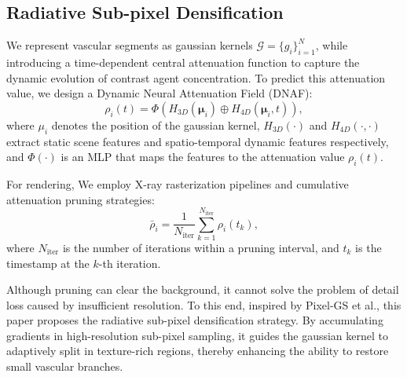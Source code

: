 \documentclass[runningheads]{llncs}
\begin{document}
\subsection{Radiative Sub-pixel Densification}%
We represent vascular segments as gaussian kernels \(\mathcal{G} = \{g_i\}_{i=1}^{N}\), while introducing a time-dependent central attenuation function to capture the dynamic evolution of contrast agent concentration. To predict this attenuation value, we design a Dynamic Neural Attenuation Field (DNAF):
\begin{equation}
\rho_i(t) = \Phi\left(H_{3D}(\bm{\mu}_i) \oplus H_{4D}(\bm{\mu}_i, t)\right),
\end{equation}
where \(\mu_i\) denotes the position of the gaussian kernel, \(H_{3D}(\cdot)\)\cite{muller2022instant} and \(H_{4D}(\cdot,\cdot)\)\cite{park2023temporal} extract static scene features and spatio-temporal dynamic features respectively, and \(\Phi(\cdot)\) is an MLP that maps the features to the attenuation value \(\rho_i(t)\).

For rendering, We employ X-ray rasterization pipelines and cumulative attenuation pruning strategies:
\begin{equation}
\bar{\rho}_i = \frac{1}{N_{\text{iter}}} \sum_{k=1}^{N_{\text{iter}}} \rho_i(t_k),
\end{equation}
where $N_{\text{iter}}$ is the number of iterations within a pruning interval, and $t_k$ is the timestamp at the $k$-th iteration. %

Although pruning can clear the background, it cannot solve the problem of detail loss caused by insufficient resolution. To this end, inspired by Pixel-GS et al.\cite{zhang2024pixel}\cite{bulo2024revising}, this paper proposes the radiative sub-pixel densification strategy. By accumulating gradients in high-resolution sub-pixel sampling, it guides the gaussian kernel to adaptively split in texture-rich regions, thereby enhancing the ability to restore small vascular branches.
\end{document}
